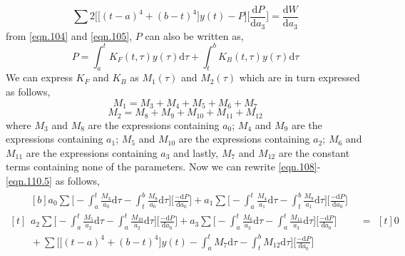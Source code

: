 \documentclass[letterpaper%
, twoside%
, 12pt%
,memoire%
, english%
,creativecommons,hyperref%
]{thETS}
\begin{document}
\begin{equation}\label{eqn.110.5}
\sum 2\bigg[\big[(t-a)^4 + (b-t)^4\big]y(t) - P\bigg] \bigg[\frac{\mathrm{d}P}{\mathrm{d}a_{3}}\bigg] = \frac{\mathrm{d}W}{\mathrm{d}a_{3}} 
\end{equation}
from \eqref{eqn.104} and \eqref{eqn.105}, $P$ can also be written as,
\begin{equation}\label{eqn.111}
P = \int_{a}^{t} K_{F}(t,\tau)y(\tau)\mathrm{d}\tau + \int_{t}^{b} K_{B}(t,\tau)y(\tau)\mathrm{d}\tau
\end{equation}
We can express $K_{F}$ and $K_{B}$ as $M_{1}(\tau)$ and $M_{2}(\tau)$ which are in turn expressed as follows,
\begin{equation}\label{eqn.112}
M_{1} = M_{3} + M_{4} + M_{5} + M_{6} + M_{7}
\end{equation}
\begin{equation}\label{eqn.113}
M_{2} = M_{8} + M_{9} + M_{10} + M_{11} + M_{12}
\end{equation}
where $M_{3}$ and $M_{8}$ are the expressions containing $a_{0}$; $M_{4}$ and $M_{9}$ are the expressions containing $a_{1}$; $M_{5}$ and $M_{10}$ are the expressions containing $a_{2}$; $M_{6}$ and $M_{11}$ are the expressions containing $a_{3}$ and lastly, $M_{7}$ and $M_{12}$ are the constant terms containing none of the parameters. Now we can rewrite  \eqref{eqn.108}- \eqref{eqn.110.5} as follows, 
\begin{equation}\label{eqn.114}
\begin{aligned}[t]
	\begin{aligned}[b]
	a_{0} \sum \bigg[-\int_{a}^{t}\frac{M_{3}}{a_{0}}\mathrm{d}\tau-\int_{t}^{b}\frac{M_{8}}{a_{0}}\mathrm{d}\tau\bigg] \bigg[\frac{-\mathrm{d}P}{\mathrm{d}a_{0}}\bigg] + a_{1} \sum \bigg[-\int_{a}^{t}\frac{M_{4}}{a_{1}}\mathrm{d}\tau-\int_{t}^{b}\frac{M_{9}}{a_{1}}\mathrm{d}\tau\bigg] \bigg[\frac{-\mathrm{d}P}{\mathrm{d}a_{0}}\bigg] \\
	a_{2} \sum \bigg[-\int_{a}^{t}\frac{M_{5}}{a_{2}}\mathrm{d}\tau-\int_{a}^{t}\frac{M_{10}}{a_{2}}\mathrm{d}\tau\bigg] \bigg[\frac{-\mathrm{d}P}{\mathrm{d}a_{0}}\bigg] + a_{3} \sum \bigg[-\int_{a}^{t}\frac{M_{6}}{a_{3}}\mathrm{d}\tau-\int_{a}^{t}\frac{M_{11}}{a_{3}}\mathrm{d}\tau\bigg] \bigg[\frac{-\mathrm{d}P}{\mathrm{d}a_{0}}\bigg] \\ 
	{} +\sum\bigg[\big[(t-a)^4+(b-t)^4\big]y(t) -\int_{a}^{t}{M_{7}}\mathrm{d}\tau-\int_{t}^{b}{M_{12}}\mathrm{d}\tau \bigg]\bigg[\frac{-\mathrm{d}P}{\mathrm{d}a_{0}}\bigg]
	\end{aligned}
	& =
	\begin{aligned}[t]
	0
	\end{aligned}
\end{aligned}
\end{equation}
\end{document}
